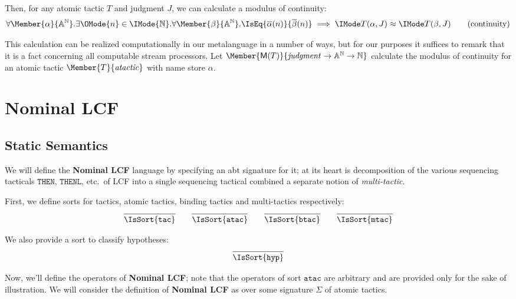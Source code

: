 Then, for any atomic tactic $T$ and judgment $J$, we can calculate a
modulus of continuity:
\begin{equation}
  \forall \Member{\alpha}{\MLStream{\MLAtom}}.
  \exists \OMode{n}\in\IMode{\MLNat}.
  \forall \Member{\beta}{\MLStream{\MLAtom}}.
    \IsEq{\bar{\alpha}(n)}{\bar{\beta}(n)}\implies \KleeneEq{T(\alpha,J)}{T(\beta,J)}
  \tag{continuity}
\end{equation}

This calculation can be realized computationally in our metalanguage in a
number of ways, but for our purposes it suffices to remark that it is a fact
concerning all computable stream processors. Let
$\Member{\ModC{T}}{\LCFJudgment\to\MLStream{\MLAtom}\to\MLNat}$ calculate the modulus of continuity
for an atomic tactic $\Member{T}{\LCFAtomicTactic}$ with name store $\alpha$.

\section{Nominal LCF}

\subsection{Static Semantics}

\newcommand\SortATac{\mathtt{atac}}
\newcommand\SortBTac{\mathtt{btac}}
\newcommand\SortTac{\mathtt{tac}}
\newcommand\SortMTac{\mathtt{mtac}}
\newcommand\SortHyp{\mathtt{hyp}}

We will define the \textbf{Nominal LCF} language by specifying an abt signature
for it; at its heart is decomposition of the various sequencing tacticals
$\mathtt{THEN}$, $\mathtt{THENL}$, etc.\ of LCF into a single sequencing
tactical combined a separate notion of \emph{multi-tactic}.

First, we define sorts for tactics, atomic tactics, binding tactics and multi-tactics
respectively:
\begin{gather*}
  \infer{
    \IsSort{\SortTac}
  }{}
  \qquad
  \infer{
    \IsSort{\SortATac}
  }{}
  \qquad
  \infer{
    \IsSort{\SortBTac}
  }{}
  \qquad
  \infer{
    \IsSort{\SortMTac}
  }{}
\end{gather*}

We also provide a sort to classify hypotheses:
\[
  \infer{
    \IsSort{\SortHyp}
  }{
  }
\]

Now, we'll define the operators of \textbf{Nominal LCF}; note that the
operators of sort $\SortATac$ are arbitrary and are provided only for the sake
of illustration. We will consider the definition of \textbf{Nominal LCF} as
over some signature $\Sigma$ of atomic tactics.

